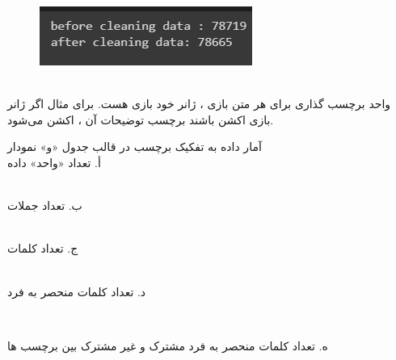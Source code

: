 \begin{figure}[H]
    \centering
    \includegraphics[width=0.7\linewidth]{./images/b_a_clean.png}
   \end{figure}
   \\
   
واحد برچسب گذاری برای هر متن بازی ، ژانر خود بازی هست. برای مثال اگر ژانر بازی اکشن باشند برچسب توضیحات آن ، اکشن می‌شود.

آمار داده به تفکیک برچسب در قالب جدول «و» نمودار
\\
أ. تعداد «واحد» داده
\begin{latin}
\begin{center}
  \fontsize{8pt}{9pt}\ttfamily
\end{center}
\end{latin}

\\
ب. تعداد جملات
\begin{latin}
\begin{center}
  \fontsize{8pt}{9pt}\ttfamily
\end{center}
\end{latin}

\\
\newpage
ج. تعداد کلمات
\begin{latin}
\begin{center}
  \fontsize{8pt}{9pt}\ttfamily
\end{center}
\end{latin}

\\

د. تعداد کلمات منحصر به فرد

\

\begin{latin}
\begin{center}
  \fontsize{8pt}{9pt}\ttfamily
\end{center}
\end{latin}

ه. تعداد کلمات منحصر به فرد مشترک و غیر مشترک بین برچسب ها
\begin{latin}
\begin{center}
  \fontsize{8pt}{9pt}\ttfamily
\end{center}
\end{latin}

